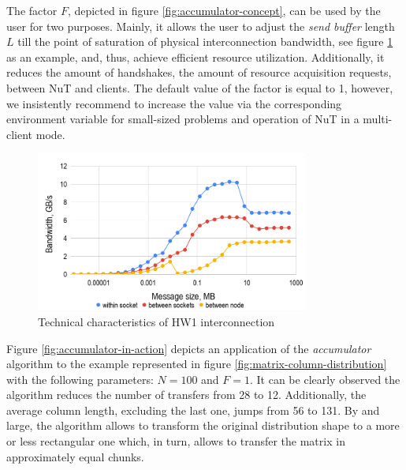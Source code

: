 The factor $F$, depicted in figure \ref{fig:accumulator-concept}, can be used by the user for two purposes. Mainly, it allows the user to adjust the \textit{send buffer} length $L$ till the point of saturation of physical interconnection bandwidth, see figure \ref{fig:hw1-bandwidth} as an example, and, thus, achieve efficient resource utilization. Additionally, it reduces the amount of handshakes, the amount of resource acquisition requests, between NuT and clients. The default value of the factor is equal to 1, however, we insistently recommend to increase the value via the corresponding environment variable for small-sized problems and operation of NuT in a multi-client mode.\\


\begin{figure}[htpb]
  \centering
  \includegraphics[width=0.8\textwidth]{figures/chapter-3/hw1-bandwidth.png}
  \caption{Technical characteristics of HW1 interconnection} \label{fig:hw1-bandwidth}
\end{figure}



Figure \ref{fig:accumulator-in-action} depicts an application of the \textit{accumulator} algorithm to the example represented in figure \ref{fig:matrix-column-distribution} with the following parameters: $N = 100$ and $F = 1$. It can be clearly observed the algorithm reduces the number of transfers from 28 to 12. Additionally, the average column length, excluding the last one, jumps from 56 to 131. By and large, the algorithm allows to transform the original distribution shape to a more or less rectangular one which, in turn, allows to transfer the matrix in approximately equal chunks.\\



